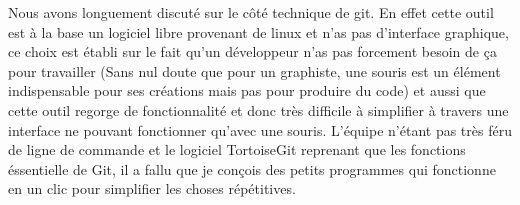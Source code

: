 Nous avons longuement discuté sur le côté technique de git. En effet cette outil est à la base un logiciel libre provenant de linux et n'as pas
d'interface graphique, ce choix est établi sur le fait qu'un développeur n'as pas forcement besoin de ça pour travailler (Sans nul doute que pour un
graphiste, une souris est un élément indispensable pour ses créations mais pas pour produire du code) et aussi que cette outil regorge de
fonctionnalité et donc très difficile à simplifier à travers une interface ne pouvant fonctionner qu'avec une souris. L'équipe n'étant pas très féru de
ligne de commande et le logiciel TortoiseGit reprenant que les fonctions éssentielle de Git, il a fallu que je conçois des petits programmes qui
fonctionne en un clic pour simplifier les choses répétitives.



\clearpage
